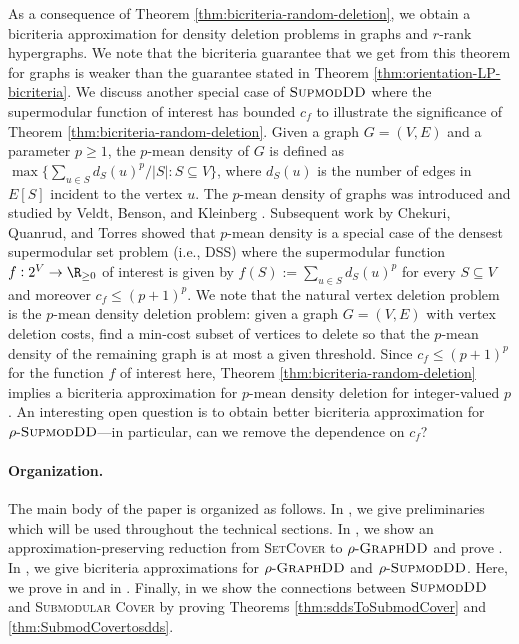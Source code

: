 \documentclass{article}
\newcommand{\dss}{\textsc{DSS}\xspace}
\newcommand{\dds}{\ensuremath{\textsc{GraphDD}}\xspace}
\newcommand{\rhodds}[1]{\ensuremath{#1\text{-}\dds}\xspace}
\newcommand{\sdds}{\ensuremath{\textsc{SupmodDD}}\xspace}
\newcommand{\rhosdds}[1]{\ensuremath{#1\text{-}\sdds}}
\newcommand{\setcover}{\textsc{SetCover}\xspace}
\begin{document}
As a consequence of Theorem \ref{thm:bicriteria-random-deletion}, we obtain a bicriteria approximation for density deletion problems in graphs and $r$-rank hypergraphs. We note that the bicriteria guarantee that we get from this theorem for graphs is weaker than the guarantee stated in Theorem \ref{thm:orientation-LP-bicriteria}. 
We discuss another special case of \sdds where the supermodular function of interest has bounded $c_f$ to illustrate the significance of Theorem \ref{thm:bicriteria-random-deletion}. Given a graph $G=(V, E)$ and a parameter $p\ge 1$, the $p$-mean density of $G$ is defined as $\max\{\sum_{u\in S}d_S(u)^p/|S|: S\subseteq V\}$, where $d_S(u)$ is the number of edges in $E[S]$ incident to the vertex $u$. The $p$-mean density of graphs was introduced and studied by Veldt, Benson, and Kleinberg \cite{vbk-21}. Subsequent work by Chekuri, Quanrud, and Torres \cite{cqt-22} showed that $p$-mean density is a special case of the densest supermodular set problem (i.e., \dss) where the supermodular function $f: 2^V\rightarrow \R_{\ge 0}$ of interest is given by $f(S):=\sum_{u\in S}d_S(u)^p$ for every $S\subseteq V$ and moreover $c_f\le (p+1)^p$. We note that the natural vertex deletion problem is the $p$-mean density deletion problem: 
given a graph $G=(V, E)$ with vertex deletion costs, 
find a min-cost subset of vertices to delete so that the $p$-mean density of the remaining graph is at most a given threshold. Since $c_f\le (p+1)^p$ for the function $f$ of interest here, Theorem \ref{thm:bicriteria-random-deletion} implies a bicriteria approximation for $p$-mean density deletion  for integer-valued $p$. 
An interesting open question is to obtain better bicriteria approximation for \rhosdds{\rho}---in particular, can we remove the dependence on $c_f$? 

\paragraph{Organization.} The main body of the paper is organized as follows. In , we give preliminaries which will be used throughout the technical sections. In , we show an approximation-preserving reduction from \setcover to \rhodds{\rho} and prove . In , we give bicriteria approximations for 
\rhodds{\rho} and \rhosdds{\rho}. Here, we prove  in  and  in . Finally, in  we show the connections between \sdds and \textsc{Submodular Cover} by proving Theorems \ref{thm:sddsToSubmodCover} and \ref{thm:SubmodCovertosdds}.
\end{document}

